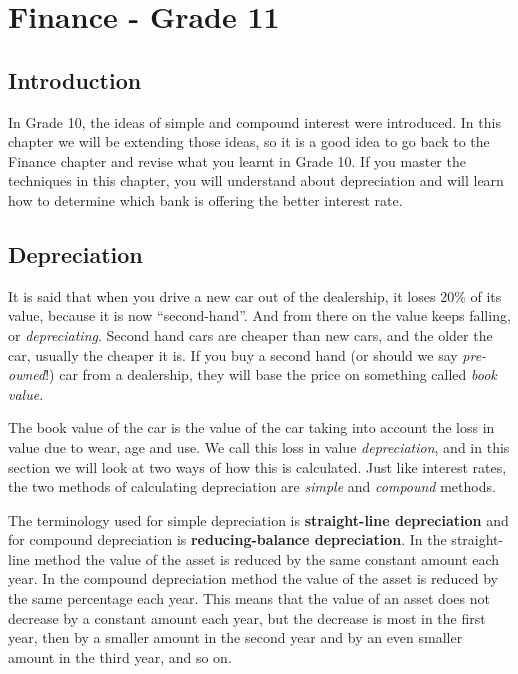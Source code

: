 \chapter{Finance - Grade 11}
\label{m:f11}

\section{Introduction}
In Grade 10, the ideas of simple and compound interest were introduced. In this chapter we will be extending those ideas, so it is a good idea to go back to the Finance chapter and revise what you learnt in Grade 10. If you master the techniques in this chapter, you will understand about depreciation and will learn how to determine which bank is offering the better interest rate.

\section{Depreciation}

It is said that when you drive a new car out of the dealership, it loses 20\% of its value, because it is now ``second-hand''. And from there on the value keeps falling, or \textit{depreciating}. Second hand cars are cheaper than new cars, and the older the car, usually the cheaper it is. If you buy a second hand (or should we say \textit{pre-owned}!) car from a dealership, they will base the price on something called \textit{book value}.

The book value of the car is the value of the car taking into account the loss in value due to wear, age and use. We call this loss in value \textit{depreciation}, and in this section we will look at two ways of how this is calculated. Just like interest rates, the two methods of calculating depreciation are \textit{simple} and \textit{compound} methods.

The terminology used for simple depreciation is \textbf{straight-line depreciation} and for compound depreciation is \textbf{reducing-balance depreciation}.  In the straight-line method the value of the asset is reduced by the same constant amount each year. In the compound depreciation method the value of the asset is reduced by the same percentage each year. This means that the value of an asset does not decrease by a constant amount each year, but the decrease is most in the first year, then by a smaller amount in the second year and by an even smaller amount in the third year, and so on.

